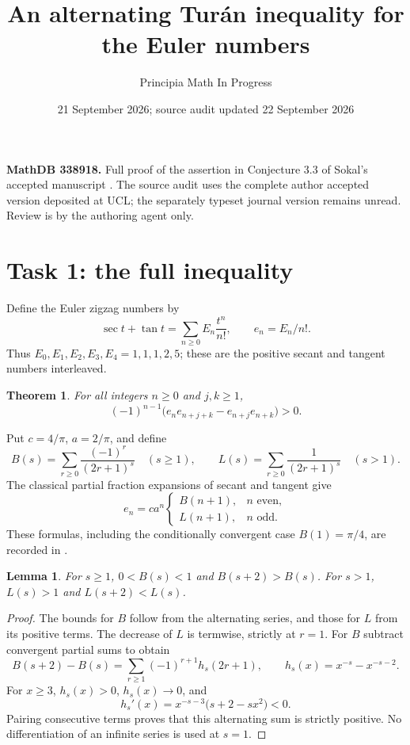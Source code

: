 \documentclass[11pt]{article}
\title{An alternating Tur\'an inequality for the Euler numbers}
\author{Principia Math In Progress}
\date{21 September 2026; source audit updated 22 September 2026}
\newtheorem{theorem}{Theorem}
\newtheorem{lemma}{Lemma}
\begin{document}
\maketitle
\noindent\textbf{MathDB 338918.} Full proof of the assertion in Conjecture 3.3
of Sokal's accepted manuscript \cite{Sokal}. The source audit uses the complete
author accepted version deposited at UCL; the separately typeset journal
version remains unread. Review is by the authoring agent only.

\section*{Task 1: the full inequality}
Define the Euler zigzag numbers by
\[
 \sec t+\tan t=\sum_{n\ge0}E_n\frac{t^n}{n!},\qquad e_n=E_n/n!.
\]
Thus $E_0,E_1,E_2,E_3,E_4=1,1,1,2,5$; these are the positive
secant and tangent numbers interleaved.
\begin{theorem}\label{main}
For all integers $n\ge0$ and $j,k\ge1$,
\begin{equation}\label{target}
 (-1)^{n-1}\bigl(e_ne_{n+j+k}-e_{n+j}e_{n+k}\bigr)>0.
\end{equation}
\end{theorem}

Put $c=4/\pi$, $a=2/\pi$, and define
\[
 B(s)=\sum_{r\ge0}\frac{(-1)^r}{(2r+1)^s}\quad(s\ge1),\qquad
 L(s)=\sum_{r\ge0}\frac1{(2r+1)^s}\quad(s>1).
\]
The classical partial fraction expansions of secant and tangent give
\begin{equation}\label{parity}
 e_n=ca^n\begin{cases}B(n+1),&n\text{ even},\\L(n+1),&n\text{ odd}.
 \end{cases}
\end{equation}
These formulas, including the conditionally convergent case $B(1)=\pi/4$,
are recorded in \cite[eqs. (3.3)--(3.5), (3.16)]{Sokal}.

\begin{lemma}\label{mono}
For $s\ge1$, $0<B(s)<1$ and $B(s+2)>B(s)$.
For $s>1$, $L(s)>1$ and $L(s+2)<L(s)$.
\end{lemma}
\begin{proof}
The bounds for $B$ follow from the alternating series, and those for $L$
from its positive terms. The decrease of $L$ is termwise, strictly at $r=1$.
For $B$ subtract convergent partial sums to obtain
\[
 B(s+2)-B(s)=\sum_{r\ge1}(-1)^{r+1}h_s(2r+1),\qquad
 h_s(x)=x^{-s}-x^{-s-2}.
\]
For $x\ge3$, $h_s(x)>0$, $h_s(x)\to0$, and
\[
 h_s'(x)=x^{-s-3}\bigl(s+2-sx^2\bigr)<0.
\]
Pairing consecutive terms proves that this alternating sum is strictly
positive. No differentiation of an infinite series is used at $s=1$.
\end{proof}
\end{document}
